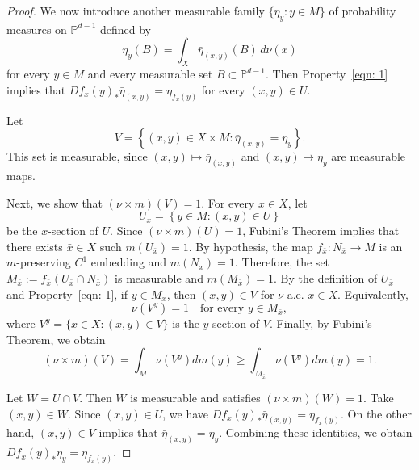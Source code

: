 \documentclass[a4paper,12pt,reqno]{amsart}
\numberwithin{equation}{section}
\newcommand{\Pp}{{\mathbb{P}}}
\begin{document}
\begin{proof}
We now introduce another measurable family $\{\eta_y \colon y \in M\}$ of probability measures on $\Pp^{d-1}$ defined by 
\[
\eta_y(B) = \int_X \bar{\eta}_{(x,y)}(B) \,d \nu(x) 
\]
for every  $y \in M$ and every measurable set $B \subset \Pp^{d-1}$.  Then Property~\eqref{eqn: 1} implies that $Df_x(y)_* \bar{\eta}_{(x,y)} = \eta_{f_x(y)}$ for every $(x,y) \in U$.

Let 
\[
V = \left\{ (x,y) \in X \times M : \bar{\eta}_{(x,y)} = \eta_y \right\}.
\]
This set is measurable, since $(x,y) \mapsto \bar{\eta}_{(x,y)}$ and $(x,y) \mapsto \eta_y$ are measurable maps. 

Next, we show that $(\nu \times m)(V)=1$. For every $x \in X$, let
\[
U_x = \left \{ y \in M : (x,y) \in U\right \}
\]
be the $x$-section of $U$. Since $(\nu \times m)(U)=1$,  Fubini's Theorem implies that there exists $\bar{x} \in X$ such $m(U_{\bar{x}})=1$. By hypothesis, the map $f_{\bar{x}} \colon N_{\bar{x}} \to M$ is an $m$-preserving $C^1$ embedding and $m(N_x)=1$. Therefore, the set $M_{\bar{x}}:= f_{\bar{x}}(U_{\bar{x}} \cap N_{\bar{x}})$ is measurable and $m(M_{\bar{x}})=1$. By the definition of $U_{\bar{x}}$ and Property~\eqref{eqn: 1}, if $y \in M_{\bar{x}}$, then $(x,y) \in V$ for $\nu$-a.e. $x \in X$. Equivalently, 
\[
\nu(V^y)=1 \quad \text{for every } y \in M_{\bar{x}},
\]
where $V^y = \{x \in X : (x,y) \in V\}$ is the $y$-section of $V$. Finally, by Fubini's Theorem,  we obtain
\[
(\nu \times m)(V) = \int_M \nu(V^y) dm(y) \ge  \int_{M_{\bar{x}}} \nu(V^y) dm(y)  =1.
\]

Let $W = U \cap V$. Then $W$ is measurable and satisfies $(\nu \times m)(W)=1$. Take $(x,y) \in W$. Since $(x,y) \in U$, we have $Df_x(y)_* \bar{\eta}_{(x,y)}= \eta_{f_x(y)}$. On the other hand, $(x,y) \in V$ implies that $\bar{\eta}_{(x,y)} = \eta_y$. Combining these identities, we obtain $Df_x(y)_* \eta_y= \eta_{f_x(y)}$.


\end{proof}
\end{document}
